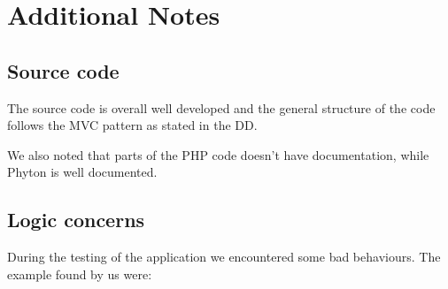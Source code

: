 \section{Additional Notes}

\subsection{Source code}
The source code is overall well developed and the general structure of the code follows the MVC pattern as stated in the DD.

We also noted that parts of the PHP code doesn't have documentation, while Phyton is well documented.

\subsection{Logic concerns}
During the testing of the application we encountered some bad behaviours.
The example found by us were:
